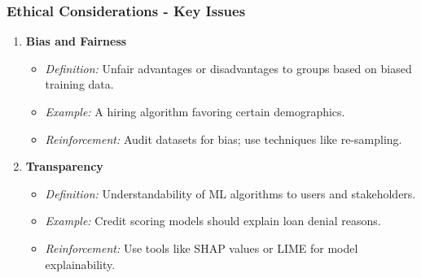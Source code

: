 \documentclass[aspectratio=169]{beamer}
\begin{document}
\begin{frame}[fragile]
    \frametitle{Ethical Considerations - Key Issues}
    \begin{enumerate}
        \item \textbf{Bias and Fairness}
        \begin{itemize}
            \item \textit{Definition:} Unfair advantages or disadvantages to groups based on biased training data.
            \item \textit{Example:} A hiring algorithm favoring certain demographics.
            \item \textit{Reinforcement:} Audit datasets for bias; use techniques like re-sampling.
        \end{itemize}

        \item \textbf{Transparency}
        \begin{itemize}
            \item \textit{Definition:} Understandability of ML algorithms to users and stakeholders.
            \item \textit{Example:} Credit scoring models should explain loan denial reasons.
            \item \textit{Reinforcement:} Use tools like SHAP values or LIME for model explainability.
        \end{itemize}
    \end{enumerate}
\end{frame}
\end{document}
